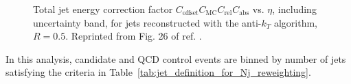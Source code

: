 \documentclass[dissertation.tex]{subfiles}
\begin{document}
\begin{figure}
	\caption{Total jet energy correction factor $C_{\mathrm{offset}}C_{\mathrm{MC}}C_{\mathrm{rel}}C_{\mathrm{abs}}$ vs. $\eta$, including uncertainty band, for jets reconstructed with the anti-$k_{T}$ algorithm, $R = 0.5$.  Reprinted from Fig. 26 of ref. \cite{1748-0221-6-11-P11002}.}
	\label{fig:total_JEC}
\end{figure}

In this analysis, candidate and QCD control events are binned by number of jets satisfying the criteria in Table~\ref{tab:jet_definition_for_Nj_reweighting}.
\end{document}
